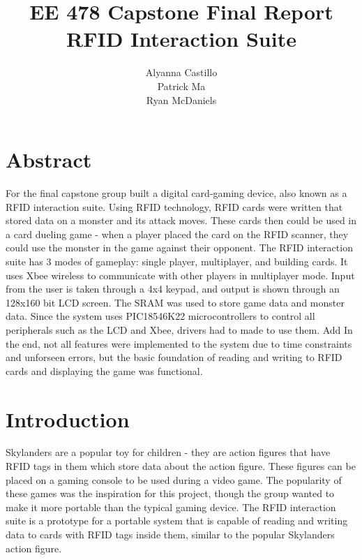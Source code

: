 \documentclass[12pt]{article} %
\title{\TitleFont EE 478 Capstone Final Report \\ RFID Interaction Suite \vfill }
\author{\AuthorFont Alyanna Castillo \\ Patrick Ma \\ Ryan McDaniels}
\date{}
\begin{document}
\maketitle
\thispagestyle{empty}
\pagebreak \tableofcontents
\listoftables
\listoffigures
\thispagestyle{empty}
\pagebreak
\setcounter{page}{1}

\section{Abstract}
% 

For the final capstone group built a digital card-gaming device, also known as a RFID interaction suite. Using RFID technology, RFID cards were written that stored data on a monster and its attack moves. These cards then could be used in a card dueling game - when a player placed the card on the RFID scanner, they could use the monster in the game against their opponent. The RFID interaction suite has 3 modes of gameplay: single player, multiplayer, and building cards. It uses Xbee wireless to communicate with other players in multiplayer mode. Input from the user is taken through a 4x4 keypad, and output is shown through an 128x160 bit LCD screen. The SRAM was used to store game data and monster data. Since the system uses PIC18546K22 microcontrollers to control all peripherals such as the LCD and Xbee, drivers had to made to use them. Add In the end, not all features were implemented to the system due to time constraints and unforseen errors, but the basic foundation of reading and writing to RFID cards and displaying the game was functional.

\section{Introduction}

Skylanders are a popular toy for children - they are action figures that have RFID tags in them which store data about the action figure. These figures can be placed on a gaming console to be used during a video game. The popularity of these games was the inspiration for this project, though the group wanted to make it more portable than the typical gaming device. The RFID interaction suite is a prototype for a portable system that is capable of reading and writing data to cards with RFID tags inside them, similar to the popular Skylanders action figure.
\end{document}
